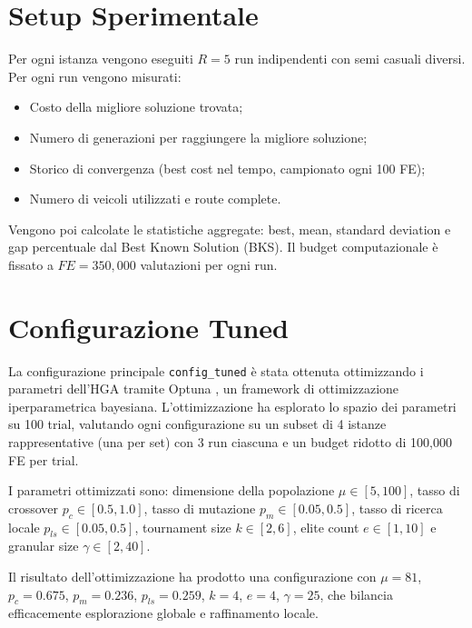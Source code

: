 \section{Setup Sperimentale}

Per ogni istanza vengono eseguiti $R = 5$ run indipendenti con semi casuali diversi.
Per ogni run vengono misurati:
\begin{itemize}
    \item Costo della migliore soluzione trovata;
    \item Numero di generazioni per raggiungere la migliore soluzione;
    \item Storico di convergenza (best cost nel tempo, campionato ogni 100 FE);
    \item Numero di veicoli utilizzati e route complete.
\end{itemize}

Vengono poi calcolate le statistiche aggregate: best, mean, standard deviation e gap
percentuale dal Best Known Solution (BKS). Il budget computazionale \`e fissato a
$FE = 350{,}000$ valutazioni per ogni run.

\section{Configurazione Tuned}

La configurazione principale \texttt{config\_tuned} \`e stata ottenuta ottimizzando
i parametri dell'HGA tramite Optuna \cite{akiba2019optuna}, un framework di ottimizzazione iperparametrica
bayesiana. L'ottimizzazione ha esplorato lo spazio dei parametri su 100 trial,
valutando ogni configurazione su un subset di 4 istanze rappresentative (una per set)
con 3 run ciascuna e un budget ridotto di 100{,}000 FE per trial.

I parametri ottimizzati sono: dimensione della popolazione $\mu \in [5, 100]$,
tasso di crossover $p_c \in [0.5, 1.0]$, tasso di mutazione $p_m \in [0.05, 0.5]$,
tasso di ricerca locale $p_{ls} \in [0.05, 0.5]$, tournament size $k \in [2, 6]$,
elite count $e \in [1, 10]$ e granular size $\gamma \in [2, 40]$.

Il risultato dell'ottimizzazione ha prodotto una configurazione con $\mu = 81$,
$p_c = 0.675$, $p_m = 0.236$, $p_{ls} = 0.259$, $k = 4$, $e = 4$, $\gamma = 25$,
che bilancia efficacemente esplorazione globale e raffinamento locale.
